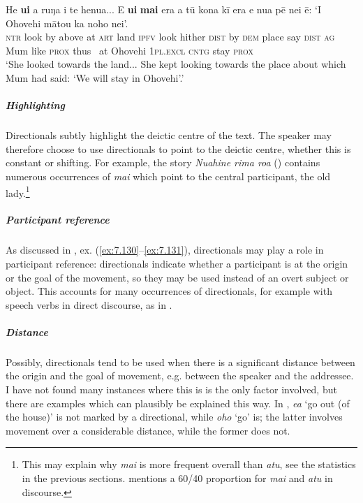 \ea\label{ex:7.152}
\gll He \textbf{u{\ꞌ}i} a ruŋa i te henua... E \textbf{u{\ꞌ}i} \textbf{mai} era a tū kona kī era  e nua pē nei ē: ‘{\ꞌ}I {\ꞌ}Ohovehi mātou ka noho nei’.\\
\textsc{ntr} look by above at \textsc{art} land \textsc{ipfv} look hither \textsc{dist} by \textsc{dem} place say \textsc{dist}  \textsc{ag} Mum like \textsc{prox} thus ~at Ohovehi \textsc{1pl.excl} \textsc{cntg} stay \textsc{prox}\\

\glt
‘She looked towards the land... She kept looking towards the place about which Mum had said: ‘We will stay in Ohovehi’.’ \textstyleExampleref{[R210.082–083]}
\z

\subparagraph{Highlighting} Directionals subtly highlight the deictic centre of the text. The speaker may therefore choose to use directionals to point to the deictic centre, whether this is constant or shifting. For example, the story \textit{Nuahine rima roa} () contains numerous occurrences of \textit{mai} which point to the central participant, the old lady.\footnote{\label{fn:368}This may explain why \textit{mai} is more frequent overall than \textit{atu}, see the statistics in the previous sections. \citet[1742]{Hooper2004} mentions a 60/40 proportion for \textit{mai} and \textit{atu} in  discourse.}

\subparagraph{Participant reference} As discussed in , ex. (\ref{ex:7.130}–\ref{ex:7.131}), directionals may play a role in participant reference: directionals indicate whether a participant is at the origin or the goal of the movement, so they may be used instead of an overt subject or object. This accounts for many occurrences of directionals, for example with speech verbs in direct discourse, as in .

\subparagraph{Distance} Possibly, directionals tend to be used when there is a significant distance between the origin and the goal of movement, e.g. between the speaker and the addressee. I have not found many instances where this is is the only factor involved, but there are examples which can plausibly be explained this way. In , \textit{e{\ꞌ}a} ‘go out (of the house)’ is not marked by a directional, while \textit{oho} ‘go’ is; the latter involves movement over a considerable distance, while the former does not. 

